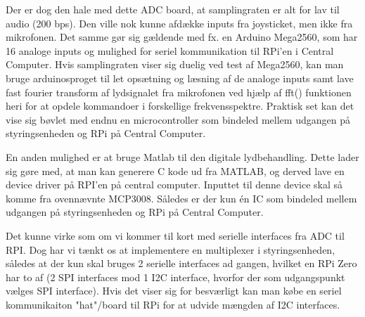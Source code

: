 Der er dog den hale med dette ADC board, at samplingraten er alt for lav til audio (200 bps). Den ville nok kunne afdække inputs fra joysticket, men ikke fra mikrofonen. 
Det samme gør sig gældende med fx. en Arduino Mega2560, som har 16 analoge inputs og mulighed for seriel kommunikation til RPi'en i Central Computer. \tbr Hvis samplingraten viser sig duelig ved test af Mega2560, kan man bruge arduinosproget til let opsætning og læsning af de analoge inputs samt lave fast fourier transform af lydsignalet fra mikrofonen ved hjælp af fft() funktionen heri for at opdele kommandoer i forskellige frekvensspektre. Praktisk set kan det vise sig bøvlet med endnu en microcontroller som bindeled mellem udgangen på styringsenheden og  RPi på Central Computer.

En anden mulighed er at bruge Matlab til den digitale lydbehandling.
Dette lader sig gøre med, at man kan generere C kode ud fra MATLAB, og derved lave en device driver på RPI'en på central computer\cite{MATLabDocCCode}. Inputtet til denne device skal så komme fra ovennævnte MCP3008\cite{MCP3008Data}. Således er der kun én IC som bindeled mellem udgangen på styringsenheden og RPi på Central Computer.

Det kunne virke som om vi kommer til kort med serielle interfaces fra ADC til RPI. Dog har vi tænkt os at implementere en multiplexer i styringsenheden, således at der kun skal bruges 2 serielle interfaces ad gangen, hvilket en RPi Zero har to af (2 SPI interfaces mod 1 I2C interface, hvorfor der som udgangspunkt vælges SPI interface). Hvis det viser sig for besværligt kan man købe en seriel kommunikaiton "hat"/board til RPi for at udvide mængden af I2C interfaces.\tbr